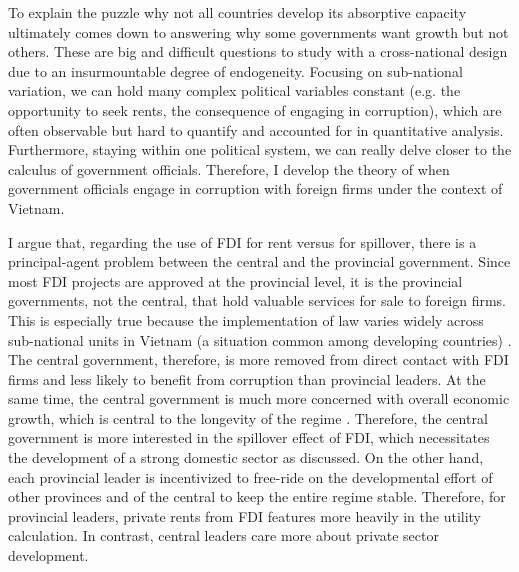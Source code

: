 \documentclass[12pt]{article}
\begin{document}
To explain the puzzle why not all countries develop its absorptive capacity ultimately comes down to answering why some governments want growth but not others. These are big and difficult questions to study with a cross-national design due to an insurmountable degree of endogeneity. Focusing on sub-national variation, we can hold many complex political variables constant (e.g. the opportunity to seek rents, the consequence of engaging in corruption), which are often observable but hard to quantify and accounted for in quantitative analysis. Furthermore, staying within one political system, we can really delve closer to the calculus of government officials. Therefore, I develop the theory of when government officials engage in corruption with foreign firms under the context of Vietnam.

I argue that, regarding the use of FDI for rent versus for spillover, there is a principal-agent problem between the central and the provincial government. Since most FDI projects are approved at the provincial level, it is the provincial governments, not the central, that hold valuable services for sale to foreign firms. This is especially true because the implementation of law varies widely across sub-national units in Vietnam (a situation common among developing countries) \citep{Meyer2005, Thun2006}. The central government, therefore, is more removed from direct contact with FDI firms and less likely to benefit from corruption than provincial leaders. At the same time, the central government is much more concerned with overall economic growth, which is central to the longevity of the regime \citep{Malesky2008}. Therefore, the central government is more interested in the spillover effect of FDI, which necessitates the development of a strong domestic sector as discussed.  On the other hand, each provincial leader is incentivized to free-ride on the developmental effort of other provinces and of the central to keep the entire regime stable. Therefore, for provincial leaders, private rents from FDI features more heavily in the utility calculation. In contrast, central leaders care more about private sector development.
\end{document}
